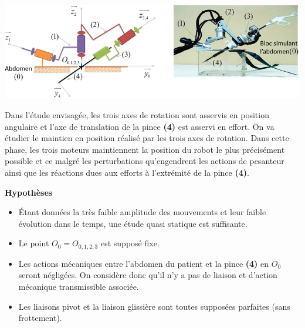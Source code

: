 \documentclass[10pt,fleqn]{article} %
\begin{document}
\begin{multicols}{2}
\begin{center}
\includegraphics[width=\linewidth]{images/fig_02}
\end{center}

Dans l’étude envisagée, les trois axes de rotation sont asservis en position angulaire et l’axe de translation de la pince \textbf{(4)} est asservi en effort. On va étudier le maintien en position réalisé par les trois axes de rotation. Dans cette phase, les trois moteurs maintiennent la position du robot le plus précisément possible et ce malgré les perturbations qu’engendrent les actions de pesanteur ainsi que les réactions dues aux efforts à l’extrémité de la pince \textbf{(4)}.

\noindent\textbf{Hypothèses}
\begin{itemize}
\item Étant données la très faible amplitude des mouvements et leur faible évolution dans le temps, une étude quasi statique est suffisante.
\item Le point $O_0 = O_{0,1,2,3}$ est supposé fixe.
\item Les actions mécaniques entre l’abdomen du patient et la pince \textbf{(4)} en $O_0$ seront négligées. On considère donc qu’il n’y a pas de liaison et d’action mécanique transmissible associée.
\item Les liaisons pivot et la liaison glissière sont toutes supposées parfaites (sans frottement).
\end{itemize}


\end{multicols}
\end{document}

